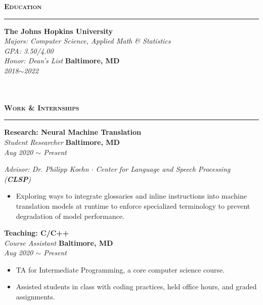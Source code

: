\documentclass[10pt, letterpaper]{article}
\begin{document}
{\large \textbf{\textsc{Education}}}
\vspace{5pt}
\hrule
{}
\begin{paracol}{2}
	\textbf{The Johns Hopkins University}\\
	\textit{Majors: Computer Science, Applied Math \& Statistics}\\
	\textit{GPA: 3.50/4.00}\\
	\textit{Honor: Dean's List}
	\switchcolumn
	\raggedleft\textbf{Baltimore, MD}\\
	\raggedleft\textit{2018$\sim$2022}\\~\\~\\
\end{paracol}
\vspace{3mm}

{\large \textbf{\textsc{Work \& Internships}}}
\vspace{5pt}
\hrule

\begin{paracol}{2}
	\textbf{Research: Neural Machine Translation}\\
	\textit{Student Researcher}
	\switchcolumn
	\raggedleft\textbf{Baltimore, MD}\\
	\raggedleft\textit{Aug 2020 $\sim$ Present}
\end{paracol}\vspace{-1mm}
\textit{Advisor: Dr. Philipp Koehn $\cdot$ Center for Language and Speech Processing (\textbf{CLSP})}
\vspace{-2mm}
\begin{itemize}
	\item Exploring ways to integrate glossaries and inline instructions into machine translation models at runtime to enforce specialized terminology to prevent degradation of model performance. 
	 
\end{itemize}
\vspace{-2mm} 

\begin{paracol}{2}
	\textbf{Teaching: C/C++}\\
	\textit{Course Assistant}
	\switchcolumn
	\raggedleft\textbf{Baltimore, MD}\\
	\raggedleft\textit{Aug 2020 $\sim$ Present}
\end{paracol}\vspace{-1mm}
\vspace{-2mm}
\begin{itemize}
	\item TA for Intermediate Programming, a core computer science course. 
	\vspace{-3mm}
	\item Assisted students in class with coding practices, held office hours, and graded assignments.
\end{itemize}
\vspace{-2mm}
\end{document}

